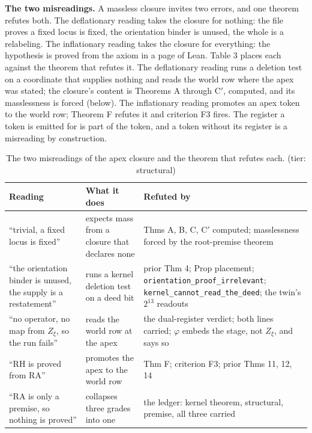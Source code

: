\documentclass[10pt]{article}
\begin{document}
\textbf{The two misreadings.} A massless closure invites two errors, and
one theorem refutes both. The deflationary reading takes the closure for
nothing: the file proves a fixed locus is fixed, the orientation binder
is unused, the whole is a relabeling. The inflationary reading takes the
closure for everything: the hypothesis is proved from the axiom in a
page of Lean. Table 3 places each against the theorem that refutes it.
The deflationary reading runs a deletion test on a coordinate that
supplies nothing and reads the world row where the apex was stated; the
closure's content is Theorems A through C\('\), computed, and its
masslessness is forced (below). The inflationary reading promotes an
apex token to the world row; Theorem F refutes it and criterion F3
fires. The register a token is emitted for is part of the token, and a
token without its register is a misreading by construction.

\begin{table}[!htbp]
\footnotesize
\caption{The two misreadings of the apex closure and the theorem that refutes each. (tier: structural)}
\begin{tabular}{@{}p{}p{}p{}@{}}
\toprule
Reading & What it does & Refuted by \\
\midrule
“trivial, a fixed locus is fixed” & expects mass from a closure that declares none & Thms A, B, C, C$'$ computed; masslessness forced by the root-premise theorem \\
“the orientation binder is unused, the supply is a restatement” & runs a kernel deletion test on a deed bit & prior Thm 4; Prop placement; \texttt{orientation\_\allowbreak}\allowbreak\texttt{proof\_\allowbreak irrelevant}; \texttt{kernel\_\allowbreak cannot\_\allowbreak}\allowbreak\texttt{read\_\allowbreak the\_\allowbreak deed}; the twin's $2^{13}$ readouts \\
“no operator, no map from $Z_\xi$, so the run fails” & reads the world row at the apex & the dual-register verdict; both lines carried; $\varphi$ embeds the stage, not $Z_\xi$, and says so \\
“RH is proved from RA” & promotes the apex to the world row & Thm F; criterion F3; prior Thms 11, 12, 14 \\
“RA is only a premise, so nothing is proved” & collapses three grades into one & the ledger: kernel theorem, structural, premise, all three carried \\
\bottomrule
\end{tabular}
\end{table}
\end{document}
